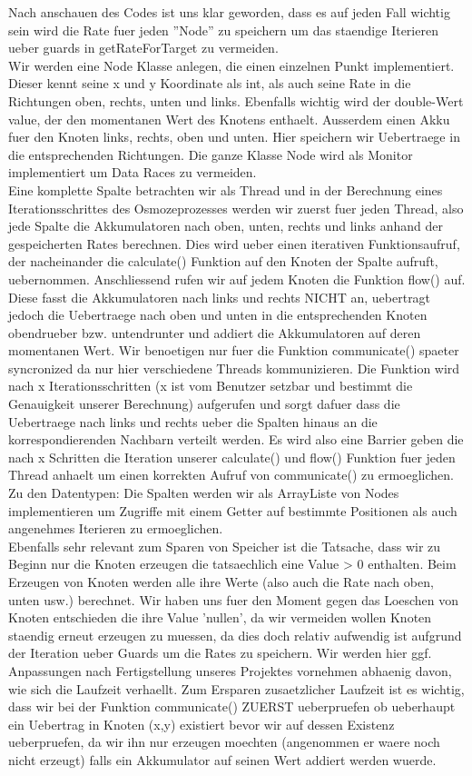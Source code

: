 \documentclass[12pt]{article}
\begin{document}
Nach anschauen des Codes ist uns klar geworden, dass es auf jeden Fall wichtig sein wird die Rate fuer jeden ''Node'' zu speichern um das staendige Iterieren ueber guards in getRateForTarget zu vermeiden.\\
Wir werden eine Node Klasse anlegen, die einen einzelnen Punkt implementiert. Dieser kennt seine x und y Koordinate als int, als auch seine Rate in die Richtungen oben, rechts, unten und links. Ebenfalls wichtig wird der double-Wert value, der den momentanen Wert des Knotens enthaelt. Ausserdem einen Akku fuer den Knoten links, rechts, oben und unten. Hier speichern wir Uebertraege in die entsprechenden Richtungen. Die ganze Klasse Node wird als Monitor implementiert um Data Races zu vermeiden. \\
Eine komplette Spalte betrachten wir als Thread und in der Berechnung eines Iterationsschrittes des Osmozeprozesses werden wir zuerst fuer jeden Thread, also jede Spalte die Akkumulatoren nach oben, unten, rechts und links anhand der gespeicherten Rates berechnen. Dies wird ueber einen iterativen Funktionsaufruf, der nacheinander die calculate() Funktion auf den Knoten der Spalte aufruft, uebernommen. Anschliessend rufen wir auf jedem Knoten die Funktion flow() auf. Diese fasst die Akkumulatoren nach links und rechts NICHT an, uebertragt jedoch die Uebertraege nach oben und unten in die entsprechenden Knoten obendrueber bzw. untendrunter und addiert die Akkumulatoren auf deren momentanen Wert. Wir benoetigen nur fuer die Funktion communicate() spaeter syncronized da nur hier verschiedene Threads kommunizieren. Die Funktion wird nach x Iterationsschritten (x ist vom Benutzer setzbar und bestimmt die Genauigkeit unserer Berechnung) aufgerufen und sorgt dafuer dass die Uebertraege nach links und rechts ueber die Spalten hinaus an die korrespondierenden Nachbarn verteilt werden. Es wird also eine Barrier geben die nach x Schritten die Iteration unserer calculate() und flow() Funktion fuer jeden Thread anhaelt um einen korrekten Aufruf von communicate() zu ermoeglichen.\\
Zu den Datentypen: Die Spalten werden wir als ArrayListe von Nodes implementieren um Zugriffe mit einem Getter auf bestimmte Positionen als auch angenehmes Iterieren zu ermoeglichen.\\
Ebenfalls sehr relevant zum Sparen von Speicher ist die Tatsache, dass wir zu Beginn nur die Knoten erzeugen die tatsaechlich eine Value > 0 enthalten. Beim Erzeugen von Knoten werden alle ihre Werte (also auch die Rate nach oben, unten usw.) berechnet. Wir haben uns fuer den Moment gegen das Loeschen von Knoten entschieden die ihre Value 'nullen', da wir vermeiden wollen Knoten staendig erneut erzeugen zu muessen, da dies doch relativ aufwendig ist aufgrund der Iteration ueber Guards um die Rates zu speichern. Wir werden hier ggf. Anpassungen nach Fertigstellung unseres Projektes vornehmen abhaenig davon, wie sich die Laufzeit verhaellt. Zum Ersparen zusaetzlicher Laufzeit ist es wichtig, dass wir bei der Funktion communicate() ZUERST ueberpruefen ob ueberhaupt ein Uebertrag in Knoten (x,y) existiert bevor wir auf dessen Existenz ueberpruefen, da wir ihn nur erzeugen moechten (angenommen er waere noch nicht erzeugt) falls ein Akkumulator auf seinen Wert addiert werden wuerde.\\
\end{document}

